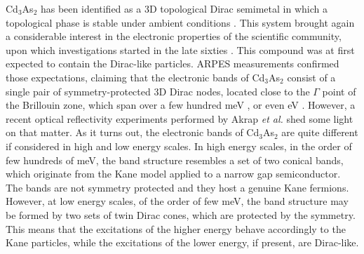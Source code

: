 \documentclass[titlepage,a4paper]{book}
\begin{document}
Cd$_3$As$_2$ has been identified as a 3D topological Dirac semimetal in which a topological phase is stable under ambient conditions \cite{Liu_CdAs}. This system brought again a considerable interest in the electronic properties of the scientific community, upon which investigations started in the late sixties \cite{Roseman_CdAs}\cite{Bodnar_CdAs}. This compound was at first expected to contain the Dirac-like particles. ARPES measurements confirmed those expectations, claiming that the electronic bands of Cd$_3$As$_2$ consist of a single pair of symmetry-protected 3D Dirac nodes, located close to the $\Gamma$ point of the Brillouin zone, which span over a few hundred meV \cite{Borisenko_CdAs}\cite{Neupane_CdAs}, or even eV \cite{Liu_CdAs}. However, a recent optical reflectivity experiments performed by Akrap \textit{et al.} \cite{Akrap_CdAs} shed some light on that matter. As it turns out, the electronic bands of Cd$_3$As$_2$ are quite different if considered in high and low energy scales. In high energy scales, in the order of few hundreds of meV, the band structure resembles a set of two conical bands, which originate from the Kane model applied to a narrow gap semiconductor. The bands are not symmetry protected and they host a genuine Kane fermions. However, at low energy scales, of the order of few meV, the band structure may be formed by two sets of twin Dirac cones, which are protected by the symmetry. This means that the excitations of the higher energy behave accordingly to the Kane particles, while the excitations of the lower energy, if present, are Dirac-like. 


\end{document}
